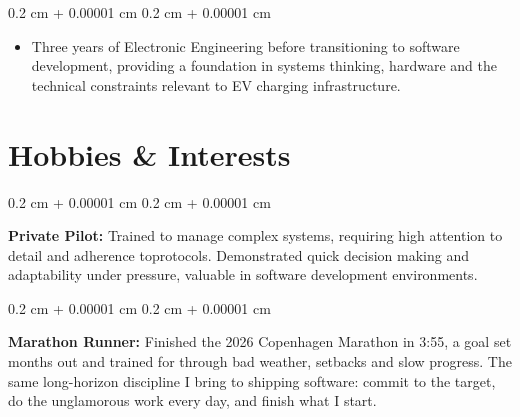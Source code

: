\documentclass[10pt, letterpaper]{article}
\newenvironment{highlights}{
    \begin{itemize}[
        topsep=0.10 cm,
        parsep=0.10 cm,
        partopsep=0pt,
        itemsep=0pt,
        leftmargin=0.4 cm + 10pt
    ]
}{
    \end{itemize}
} %
\newenvironment{onecolentry}{
    \begin{adjustwidth}{
        0.2 cm + 0.00001 cm
    }{
        0.2 cm + 0.00001 cm
    }
}{
    \end{adjustwidth}
} %
\begin{document}
        \vspace{0.10 cm}
        \begin{onecolentry}
            \begin{highlights}
                \item Three years of Electronic Engineering before transitioning to software development, providing a foundation in systems thinking, hardware and the technical constraints relevant to EV charging infrastructure.
            \end{highlights}
        \end{onecolentry}


    \section{Hobbies \& Interests}
        \begin{onecolentry}
            \textbf{Private Pilot:} Trained to manage complex systems, requiring high attention to detail and adherence toprotocols. Demonstrated quick decision making and adaptability under pressure, valuable in software development environments.
        \end{onecolentry}

        \vspace{0.20 cm}

        \begin{onecolentry}
            \textbf{Marathon Runner:} Finished the 2026 Copenhagen Marathon in 3:55, a goal set months out and trained for through bad weather, setbacks and slow progress. The same long-horizon discipline I bring to shipping software: commit to the target, do the unglamorous work every day, and finish what I start.
        \end{onecolentry}
\end{document}
